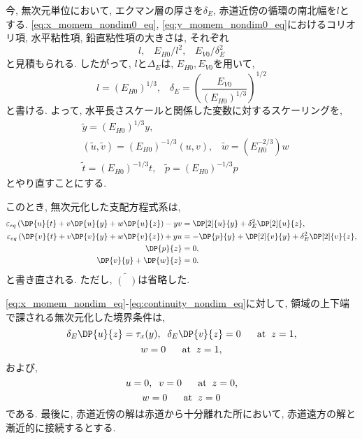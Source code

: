 今, 無次元単位において, エクマン層の厚さを$\delta_E$, 赤道近傍の循環の南北幅を$l$とする. 
\eqref{eq:x_momem_nondim0_eq}, \eqref{eq:y_momem_nondim0_eq}におけるコリオリ項, 水平粘性項, 鉛直粘性項の大きさは, それぞれ
\begin{equation*}
  l, \;\;\; E_{H0} / l^2, \;\;\; E_{V0} / \delta_E^2
\end{equation*}
と見積もられる. 
したがって, $l$と$\Delta_E$は, $E_{H0}, E_{V0}$を用いて, 
\begin{equation}
  l = (E_{H0})^{1/3}, \;\;\; 
  \delta_E = \left(\dfrac{E_{V0}}{(E_{H0})^{1/3}}\right)^{1/2}
\end{equation}
と書ける. 
よって, 水平長さスケールと関係した変数に対するスケーリングを, 
\begin{equation}
\begin{split}
   & \tilde{y} = (E_{H0})^{1/3} y, \\
   & (\tilde{u}, \tilde{v}) = (E_{H0})^{-1/3} (u,v), \;\;\; 
     \tilde{w} = (E_{H0}^{-2/3}) w \\
   & \tilde{t} = (E_{H0})^{-1/3} t, \;\;\; \tilde{p} = (E_{H0})^{-1/3} p
\end{split}
\label{eq:scale_variable_equator}
\end{equation}
とやり直すことにする. 

このとき, 無次元化した支配方程式系は, 
\begin{subequations}
\begin{align}
  \varepsilon_{eq} \left( \DP{u}{t} + v\DP{u}{y} + w\DP{u}{z} \right)  - y v 
       &=  \DP[2]{u}{y} + \delta_E^2 \DP[2]{u}{z}, \label{eq:x_momem_nondim_eq} \\
 \varepsilon_{eq} \left( \DP{v}{t} + v\DP{v}{y} + w\DP{v}{z} \right) + y u 
       &= - \DP{p}{y} + \DP[2]{v}{y} + \delta_E^2 \DP[2]{v}{z}, \label{eq:y_momem_nondim_eq} \\
  \DP{p}{z} &= 0, \label{eq:hydrostatic_nondim_eq} \\
  \DP{v}{y} + \DP{w}{z} &= 0. \label{eq:continuity_nondim_eq}
\end{align}
\end{subequations}
と書き直される. 
ただし, $\tilde{(\;\;)}$は省略した. 
 
\eqref{eq:x_momem_nondim_eq}-\eqref{eq:continuity_nondim_eq}に対して, 領域の上下端で課される無次元化した境界条件は, 
\begin{equation}
 \delta_E \DP{u}{z} = \tau_{x}(y), 
  \;\; 
 \delta_E \DP{v}{z} = 0 \;\;\;\;\;\; {\rm at} \;\; z=1, 
\label{eq:BC_top_hVel_nodim}
\end{equation}
\begin{equation}
  w = 0 \;\;\;\;\;\; {\rm at} \;\; z=1, 
\label{eq:BC_top_vVel_nodim_eq}
\end{equation}
および, 
\begin{equation}
  u=0, \;\; v=0 \;\;\;\;\;\; {\rm at} \;\; z = 0, 
\label{eq:BC_btm_hVel_nodim_eq}
\end{equation}
\begin{equation}
  w = 0 \;\;\;\;\;\; {\rm at} \;\; z=0
\label{eq:BC_btm_vVel_nodim_eq}
\end{equation}
である. 
最後に, 赤道近傍の解は赤道から十分離れた所において, 赤道遠方の解と漸近的に接続するとする. 

